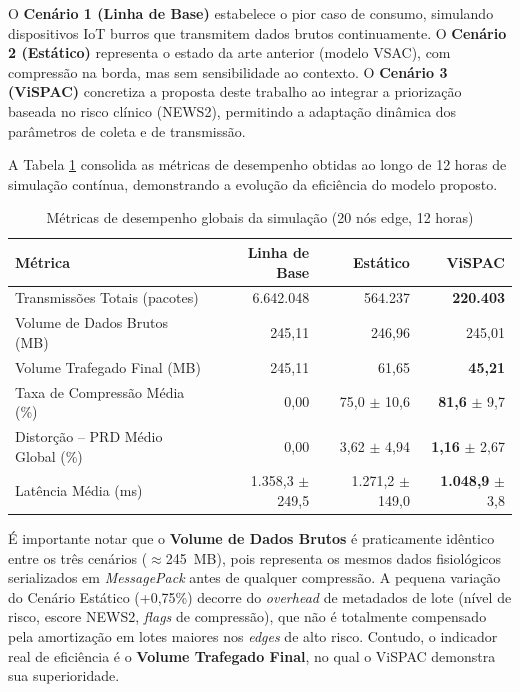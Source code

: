 \documentclass[twoside,english,brazilian]{UNISINOSmonografia}
\begin{document}
O \textbf{Cenário 1 (Linha de Base)} estabelece o pior caso de consumo, simulando dispositivos IoT burros que transmitem dados brutos continuamente. O \textbf{Cenário 2 (Estático)} representa o estado da arte anterior (modelo VSAC), com compressão na borda, mas sem sensibilidade ao contexto. O \textbf{Cenário 3 (ViSPAC)} concretiza a proposta deste trabalho ao integrar a priorização baseada no risco clínico (NEWS2), permitindo a adaptação dinâmica dos parâmetros de coleta e de transmissão.

A Tabela \ref{tab:quantitative_summary} consolida as métricas de desempenho obtidas ao longo de 12 horas de simulação contínua, demonstrando a evolução da eficiência do modelo proposto.

\begin{table}[ht]
\caption{Métricas de desempenho globais da simulação (20 nós edge, 12 horas)}
\label{tab:quantitative_summary}
\centering
\begin{tabular}{lrrr}
\hline
\textbf{Métrica} & \textbf{Linha de Base} & \textbf{Estático} & \textbf{ViSPAC} \\ \hline
Transmissões Totais (pacotes) & 6.642.048 & 564.237 & \textbf{220.403} \\
Volume de Dados Brutos (MB) & 245,11 & 246,96 & 245,01 \\
Volume Trafegado Final (MB) & 245,11 & 61,65 & \textbf{45,21} \\
Taxa de Compressão Média (\%) & 0,00 & 75,0 $\pm$ 10,6 & \textbf{81,6} $\pm$ 9,7 \\
Distorção – PRD Médio Global (\%) & 0,00 & 3,62 $\pm$ 4,94 & \textbf{1,16} $\pm$ 2,67 \\
Latência Média (ms) & 1.358,3 $\pm$ 249,5 & 1.271,2 $\pm$ 149,0 & \textbf{1.048,9} $\pm$ 3,8 \\ \hline
\end{tabular}
\end{table}

É importante notar que o \textbf{Volume de Dados Brutos} é praticamente idêntico entre os três cenários ($\approx$245~MB), pois representa os mesmos dados fisiológicos serializados em \textit{MessagePack} antes de qualquer compressão. A pequena variação do Cenário Estático (+0,75\%) decorre do \textit{overhead} de metadados de lote (nível de risco, escore NEWS2, \textit{flags} de compressão), que não é totalmente compensado pela amortização em lotes maiores nos \textit{edges} de alto risco. Contudo, o indicador real de eficiência é o \textbf{Volume Trafegado Final}, no qual o ViSPAC demonstra sua superioridade.
\end{document}
